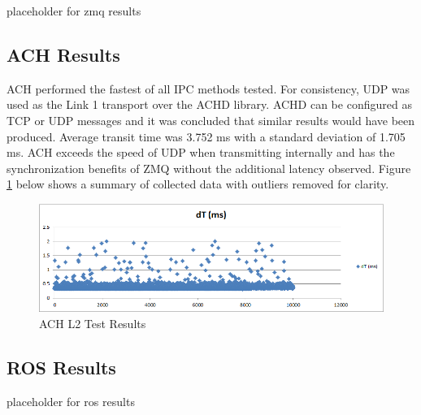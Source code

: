 placeholder for zmq results

\subsection{ACH Results}

ACH performed the fastest of all IPC methods tested. For consistency, UDP was used as the Link 1 transport over the ACHD library. ACHD can be configured as TCP or UDP messages and it was concluded that similar results would have been produced. Average transit time was 3.752 ms with a standard deviation of 1.705 ms. ACH exceeds the speed of UDP when transmitting internally and has the synchronization benefits of ZMQ without the additional latency observed. Figure \ref{fig:achresults} below shows a summary of collected data with outliers removed for clarity.

\begin{figure}[thpb]
 \centering
 \includegraphics[width=1.0\columnwidth]{./images/achtest.png}
  \caption{ACH L2 Test Results}  
  \label{fig:achresults}
\end{figure} 

\subsection{ROS Results}

placeholder for ros results

